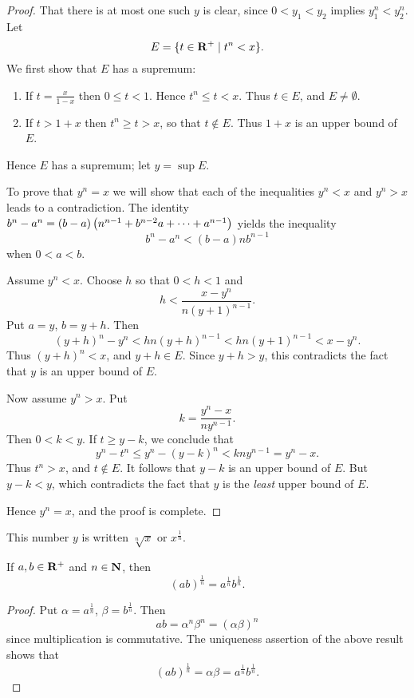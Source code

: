 \begin{proof}
That there is at most one such $y$ is clear, since $0<y_1<y_2$ implies $y_1^n<y_2^n$. Let
\[E=\{t\in\mathbf R^+\mid t^n<x\}.\]
We first show that $E$ has a supremum:
\begin{enumerate}[label=(\roman*)]
\item If $t=\frac{x}{1-x}$ then $0\le t<1$. Hence $t^n\le t<x$. Thus $t\in E$, and $E\neq\emptyset$.
\item If $t>1+x$ then $t^n\ge t>x$, so that $t\notin E$. Thus $1+x$ is an upper bound of $E$.
\end{enumerate}
Hence $E$ has a supremum; let $y=\sup E$.

To prove that $y^n=x$ we will show that each of the inequalities $y^n<x$ and $y^n>x$ leads to a contradiction. The identity $b^n-a^n=(b-a)\left(n^{n-1}+b^{n-2}a+\cdots+a^{n-1}\right)$ yields the inequality
\[b^n-a^n<(b-a)nb^{n-1}\]
when $0<a<b$.

Assume $y^n<x$. Choose $h$ so that $0<h<1$ and
\[h<\frac{x-y^n}{n(y+1)^{n-1}}.\]
Put $a=y$, $b=y+h$. Then
\[(y+h)^n-y^n<hn(y+h)^{n-1}<hn(y+1)^{n-1}<x-y^n.\]
Thus $(y+h)^n<x$, and $y+h\in E$. Since $y+h>y$, this contradicts the fact that $y$ is an upper bound of $E$.

Now assume $y^n>x$. Put
\[k=\frac{y^n-x}{ny^{n-1}}.\]
Then $0<k<y$. If $t\ge y-k$, we conclude that
\[y^n-t^n\le y^n-(y-k)^n<kny^{n-1}=y^n-x.\]
Thus $t^n>x$, and $t\notin E$. It follows that $y-k$ is an upper bound of $E$. But $y-k<y$, which contradicts the fact that $y$ is the \emph{least} upper bound of $E$.

Hence $y^n=x$, and the proof is complete.
\end{proof}

\begin{notation}
This number $y$ is written $\sqrt[n]{x}$ or $x^\frac{1}{n}$.
\end{notation}

\begin{corollary}
If $a,b\in\mathbf R^+$ and $n\in\mathbf N$, then
\[(ab)^\frac{1}{n}=a^\frac{1}{n}b^\frac{1}{n}.\]
\end{corollary}

\begin{proof}
Put $\alpha=a^\frac{1}{n}$, $\beta=b^\frac{1}{n}$. Then
\[ab=\alpha^n\beta^n=(\alpha\beta)^n\]
since multiplication is commutative. The uniqueness assertion of the above result shows that
\[(ab)^\frac{1}{n}=\alpha\beta=a^\frac{1}{n}b^\frac{1}{n}.\]
\end{proof}

